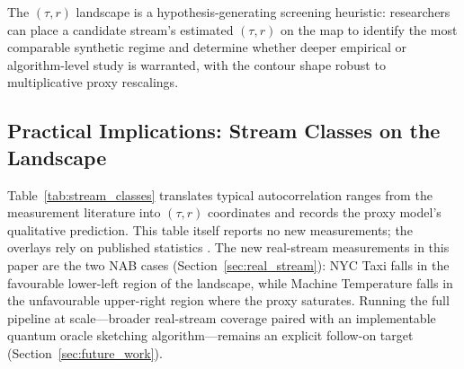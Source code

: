 \documentclass[sensors,article,submit,pdftex,moreauthors]{Definitions/mdpi}
\begin{document}
The $(\tau, r)$ landscape is a hypothesis-generating screening heuristic: researchers can place a candidate stream's estimated $(\tau, r)$ on the map to identify the most comparable synthetic regime and determine whether deeper empirical or algorithm-level study is warranted, with the contour shape robust to multiplicative proxy rescalings.

\subsection{Practical Implications: Stream Classes on the Landscape}
\label{sec:practical_impl}

Table~\ref{tab:stream_classes} translates typical autocorrelation ranges from the measurement literature into $(\tau, r)$ coordinates and records the proxy model's qualitative prediction. This table itself reports no new measurements; the overlays rely on published statistics \citep{leland1994ethernet,willinger1997selfsimilarity,beran1994statistics,su2024elasticonline,yan2024bidynamic,gama2014driftsurvey,arora2024driftreview}. The new real-stream measurements in this paper are the two NAB cases (Section~\ref{sec:real_stream}): NYC Taxi falls in the favourable lower-left region of the landscape, while Machine Temperature falls in the unfavourable upper-right region where the proxy saturates. Running the full pipeline at scale---broader real-stream coverage paired with an implementable quantum oracle sketching algorithm---remains an explicit follow-on target (Section~\ref{sec:future_work}).
\end{document}
